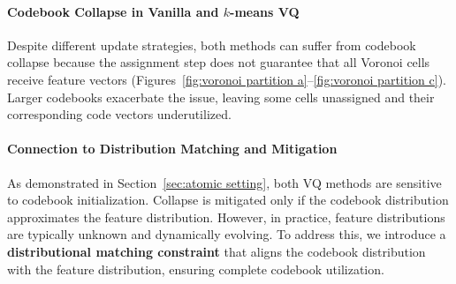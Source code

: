 \paragraph{Codebook Collapse in Vanilla and $k$-means VQ} 
Despite different update strategies, both methods can suffer from codebook collapse because the assignment step does not guarantee that all Voronoi cells receive feature vectors (Figures~\ref{fig:voronoi partition a}--\ref{fig:voronoi partition c}). Larger codebooks exacerbate the issue, leaving some cells unassigned and their corresponding code vectors underutilized.

\paragraph{Connection to Distribution Matching and Mitigation} 
As demonstrated in Section~\ref{sec:atomic setting}, both VQ methods are sensitive to codebook initialization. Collapse is mitigated only if the codebook distribution approximates the feature distribution. However, in practice, feature distributions are typically unknown and dynamically evolving. To address this, we introduce a \textbf{distributional matching constraint} that aligns the codebook distribution with the feature distribution, ensuring complete codebook utilization.


\iffalse
